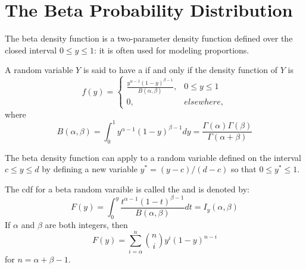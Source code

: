 \documentclass[12pt, a4paper, twoside, openright, titlepage]{book}
\begin{document}
\section{\textsection The Beta Probability Distribution}

The beta density function is a two-parameter density function defined over the closed interval $0 \leq y \leq 1$: it is often used for modeling proportions.

\begin{defn}{}{}
    A random variable $Y$ is said to have a  if and only if the density function of $Y$ is \begin{equation*}
        f(y) = \left\{\begin{array}{lc} \frac{y^{\alpha - 1}(1-y)^{\beta -1}}{B(\alpha,\beta)}, & 0 \leq y \leq 1 \\ 0, & elsewhere, \end{array}\right.
    \end{equation*}
    where \begin{equation*}
        B(\alpha,\beta) = \int_0^1y^{\alpha-1}(1-y)^{\beta-1}dy = \frac{\Gamma(\alpha)\Gamma(\beta)}{\Gamma(\alpha+\beta)}
    \end{equation*}
\end{defn}

The beta density function can apply to a random variable defined on the interval $c \leq y \leq d$ by defining a new variable $y^* = (y-c)/(d-c)$ so that $0 \leq y^*\leq 1$.

\begin{defn}{}{}
    The cdf for a beta random varaible is called the  and is denoted by: \begin{equation*}
        F(y) = \int_0^y\frac{t^{\alpha -1}(1-t)^{\beta-1}}{B(\alpha,\beta)}dt = I_y(\alpha,\beta)
    \end{equation*}
    If $\alpha$ and $\beta$ are both integers, then \begin{equation*}
        F(y) = \sum\limits_{i=\alpha}^n\binom{n}{i}y^i(1-y)^{n-i}
    \end{equation*}
    for $n = \alpha+\beta -1$.
\end{defn}
\end{document}
